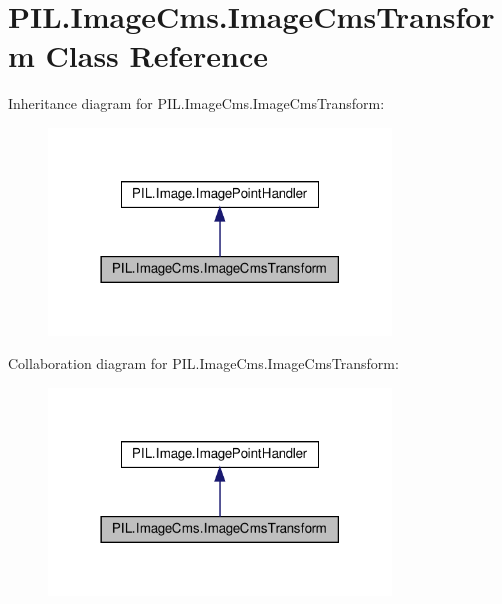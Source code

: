 \hypertarget{classPIL_1_1ImageCms_1_1ImageCmsTransform}{}\section{P\+I\+L.\+Image\+Cms.\+Image\+Cms\+Transform Class Reference}
\label{classPIL_1_1ImageCms_1_1ImageCmsTransform}


Inheritance diagram for P\+I\+L.\+Image\+Cms.\+Image\+Cms\+Transform\+:
\nopagebreak
\begin{figure}[H]
\begin{center}
\leavevmode
\includegraphics[width=258pt]{classPIL_1_1ImageCms_1_1ImageCmsTransform__inherit__graph}
\end{center}
\end{figure}


Collaboration diagram for P\+I\+L.\+Image\+Cms.\+Image\+Cms\+Transform\+:
\nopagebreak
\begin{figure}[H]
\begin{center}
\leavevmode
\includegraphics[width=258pt]{classPIL_1_1ImageCms_1_1ImageCmsTransform__coll__graph}
\end{center}
\end{figure}

